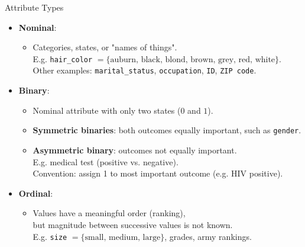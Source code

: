 \begin{frame}{Attribute Types}
  \begin{itemize}
  \item \textbf{Nominal}:
    \begin{itemize}
    \item Categories, states, or "names of things".\\
      E.g. \texttt{hair\_color} $= \{\text{auburn, black, blond, brown, grey, red, white}\}$.\\
      Other examples: \texttt{marital\_status}, \texttt{occupation}, \texttt{ID}, \texttt{ZIP code}.
    \end{itemize}
  \item \textbf{Binary}:
    \begin{itemize}
    \item Nominal attribute with only two states ($0$ and $1$).
    \item \textbf{Symmetric binaries}: both outcomes equally important, such as \texttt{gender}.
    \item \textbf{Asymmetric binary}: outcomes not equally important. \\
      E.g. medical test (positive vs. negative).\\
      Convention: assign 1 to most important outcome (e.g. HIV positive).
    \end{itemize}
  \item \textbf{Ordinal}:
    \begin{itemize}
    \item Values have a meaningful order (ranking),\\
      but magnitude between successive values is not known.\\
      E.g. \texttt{size} $= \{\text{small, medium, large}\}$, grades, army rankings.
    \end{itemize}
  \end{itemize}
\end{frame}

